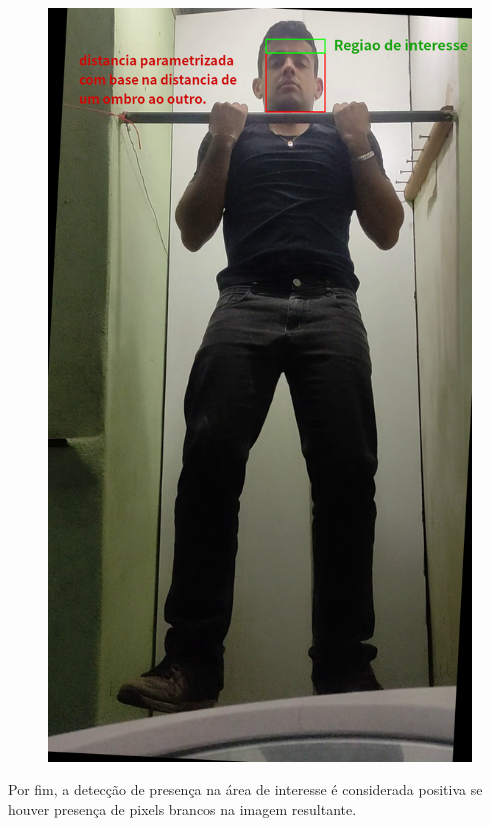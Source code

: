 \begin{figure}[H]
\begin{minipage}{\sizeImg\textwidth}
            \includegraphics[width=\textwidth]{figuras/ultrapassar_barra/133_image_with_legend.png}
        \end{minipage}
    \label{fig:Mascara_ultrapassar_barra}
\end{figure}


Por fim, a detecção de presença na área de interesse é considerada positiva se houver presença de pixels brancos na imagem resultante.


